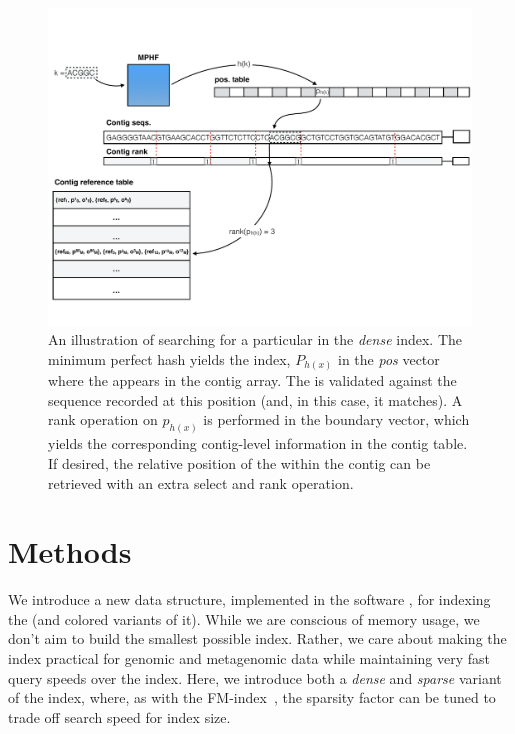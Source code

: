 \begin{figure}
  \includegraphics[width=\textwidth]{figs/index_fig}
\caption{An illustration of searching for a particular \kmer in the \emph{dense}
  \pufferfish index. The minimum perfect hash yields the index, $P_{h(x)}$ in the
  \emph{pos} vector where the \kmer appears in the contig array. The \kmer is
  validated against the sequence recorded at this position (and, in this case,
  it matches). A rank operation on $p_{h(x)}$ is performed in the boundary
  vector, which yields the corresponding contig-level information in the contig
  table. If desired, the relative position of the \kmer within the contig can be
  retrieved with an extra select and rank operation.}
\label{fig:dense_index}
\end{figure}


\section{Methods}\label{sec:methods}

We introduce a new data structure, implemented in the software \pufferfish, for
indexing the \ccdbg (and colored variants of it). While we are conscious of
memory usage, we don't aim to build the smallest possible index. Rather, we care
about making the \ccdbg index practical for genomic and metagenomic data while
maintaining very fast query speeds over the index. Here, we introduce both a
\emph{dense} and \emph{sparse} variant of the \pufferfish index, where, as with the
FM-index~\cite{Ferragina2001Experimental}, the sparsity factor can be tuned to
trade off search speed for index size. 

